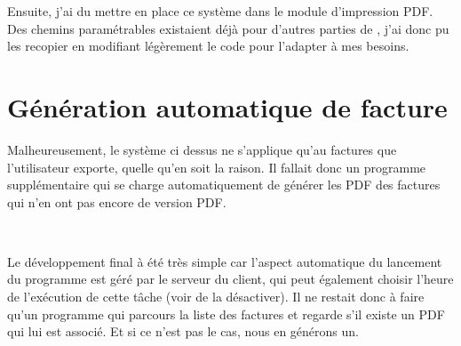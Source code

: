 Ensuite, j'ai du mettre en place ce système dans le module d'impression PDF. Des chemins paramétrables existaient déjà pour d'autres parties de \integrale, j'ai donc pu les recopier en modifiant légèrement le code pour l'adapter à mes besoins.

\section{Génération automatique de facture}
Malheureusement, le système ci dessus ne s'applique qu'au factures que l'utilisateur exporte, quelle qu'en soit la raison. Il fallait donc un programme supplémentaire qui se charge automatiquement de générer les PDF des factures qui n'en ont pas encore de version PDF.

~

Le développement final à été très simple car l'aspect automatique du lancement du programme est géré par le serveur du client, qui peut également choisir l'heure de l'exécution de cette tâche (voir de la désactiver). Il ne restait donc à faire qu'un programme qui parcours la liste des factures et regarde s'il existe un PDF qui lui est associé. Et si ce n'est pas le cas, nous en générons un.
